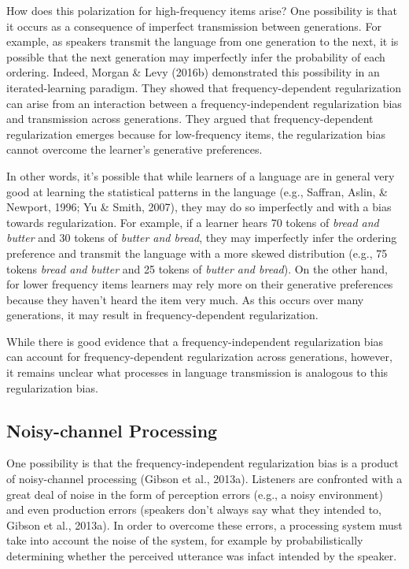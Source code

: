 \documentclass[10pt, letterpaper]{article}
\begin{document}
How does this polarization for high-frequency items arise? One
possibility is that it occurs as a consequence of imperfect transmission
between generations. For example, as speakers transmit the language from
one generation to the next, it is possible that the next generation may
imperfectly infer the probability of each ordering. Indeed, Morgan \&
Levy (2016b) demonstrated this possibility in an iterated-learning
paradigm. They showed that frequency-dependent regularization can arise
from an interaction between a frequency-independent regularization bias
and transmission across generations. They argued that
frequency-dependent regularization emerges because for low-frequency
items, the regularization bias cannot overcome the learner's generative
preferences.

In other words, it's possible that while learners of a language are in
general very good at learning the statistical patterns in the language
(e.g., Saffran, Aslin, \& Newport, 1996; Yu \& Smith, 2007), they may do
so imperfectly and with a bias towards regularization. For example, if a
learner hears 70 tokens of \emph{bread and butter} and 30 tokens of
\emph{butter and bread}, they may imperfectly infer the ordering
preference and transmit the language with a more skewed distribution
(e.g., 75 tokens \emph{bread and butter} and 25 tokens of \emph{butter
and bread}). On the other hand, for lower frequency items learners may
rely more on their generative preferences because they haven't heard the
item very much. As this occurs over many generations, it may result in
frequency-dependent regularization.

While there is good evidence that a frequency-independent regularization
bias can account for frequency-dependent regularization across
generations, however, it remains unclear what processes in language
transmission is analogous to this regularization bias.

\hypertarget{noisy-channel-processing}{%
\subsection{Noisy-channel Processing}\label{noisy-channel-processing}}

One possibility is that the frequency-independent regularization bias is
a product of noisy-channel processing (Gibson et al., 2013a). Listeners
are confronted with a great deal of noise in the form of perception
errors (e.g., a noisy environment) and even production errors (speakers
don't always say what they intended to, Gibson et al., 2013a). In order
to overcome these errors, a processing system must take into account the
noise of the system, for example by probabilistically determining
whether the perceived utterance was infact intended by the speaker.
\end{document}

